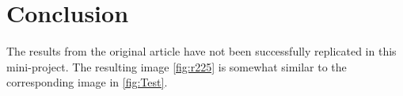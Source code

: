 \section{Conclusion}
\label{Conclusion}
The results from the original article have not been successfully replicated in this mini-project. The resulting image \autoref{fig:r225} is somewhat similar to the corresponding image in \autoref{fig:Test}. 